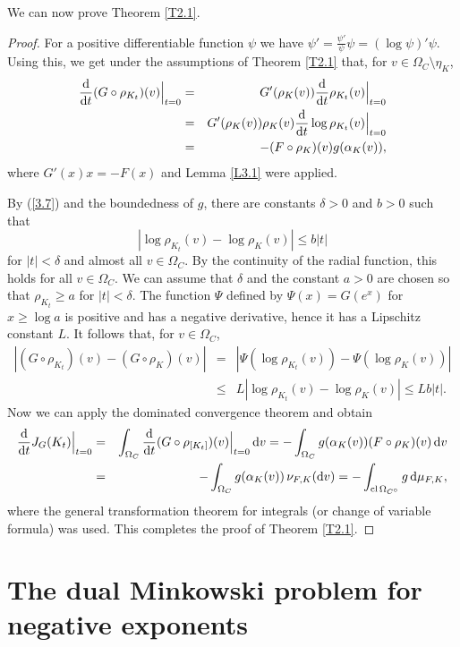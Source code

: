 \documentclass[12pt]{article}
\newcommand{\0}{\mbox{\boldmath$o$}}
\newcommand{\D}{{\rm d}}
\begin{document}
We can now prove Theorem \ref{T2.1}.

\begin{proof}
For a positive differentiable function $\psi$ we have $\psi'=\frac{\psi'}{\psi}\psi= (\log \psi)'\psi$. Using this, we get under the assumptions of Theorem \ref{T2.1} that, for $v\in\Omega_C\setminus \eta_K$,
\begin{eqnarray*}
\frac{\D}{\D t}(G\circ \rho_{K_t})(v)\Big|_{t=0} &=& G'(\rho_K(v))\frac{\D}{\D t} \rho_{K_t}(v)\Big|_{t=0}\\
&=& G'(\rho_K(v))\rho_K(v)\frac{\D}{\D t} \log \rho_{K_t}(v)\Big|_{t=0}\\
&=& -(F\circ \rho_K)(v)g(\alpha_K(v)),
\end{eqnarray*}
where $G'(x)x=-F(x)$ and Lemma \ref{L3.1} were applied. 

By (\ref{3.7}) and the boundedness of $g$, there are constants $\delta>0$ and $b>0$ such that
$$ |\log\rho_{K_t}(v) -\log\rho_K(v)|\le b|t|$$
for $|t|<\delta$ and almost all $v\in\Omega_C$. By the continuity of the radial function, this holds for all $v\in\Omega_C$. We can assume that $\delta$ and the constant $a>0$ are chosen so that $\rho_{K_t}\ge a$ for $|t|<\delta$. The function $\Psi$ defined by $\Psi(x)= G(e^x)$ for $x\ge \log a$ is positive and has a negative derivative, hence it has a Lipschitz constant $L$. It follows that, for $v\in\Omega_C$, 
\begin{eqnarray*}
|(G\circ \rho_{K_t})(v) - (G\circ \rho_K)(v)| &=& |\Psi(\log\rho_{K_t}(v)) - \Psi(\log\rho_K(v))|\\
&\le& L|\log\rho_{K_t}(v) -\log\rho_K(v)|\le Lb|t|.
\end{eqnarray*}
Now we can apply the dominated convergence theorem and obtain
\begin{eqnarray*}
\frac{\D}{\D t} J_G(K_t)\Big|_{t=0} &=& \int_{\Omega_C} \frac{\D}{\D t}(G\circ \rho_{[K_t]})(v)\Big|_{t=0}\,\D v= -\int_{\Omega_C} g(\alpha_K(v)) (F\circ\rho_K)(v)\,\D v\\
&=& -\int_{\Omega_C} g(\alpha_K(v))\,\nu_{F,K}(\D v) = -\int_{{\rm cl}\,\Omega_{C^\circ}} g\,\D\mu_{F,K},
\end{eqnarray*}
where the general transformation theorem for integrals (or change of variable formula) was used. This completes the proof of Theorem \ref{T2.1}.
\end{proof}




\section{The dual Minkowski problem for negative exponents}\label{sec4}
\end{document}
